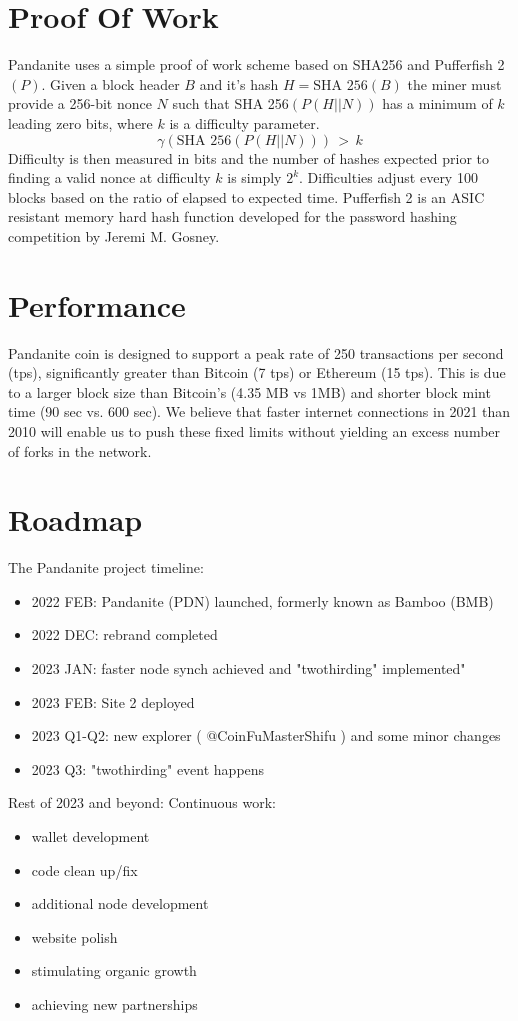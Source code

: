 \documentclass[11pt, a4paper]{elegantpaper}
\begin{document}
\section{ Proof Of Work}
Pandanite uses a simple proof of work scheme based on SHA256 and Pufferfish 2 $(P)$. Given a block
header $B$ and it’s hash $H = \text{SHA 256}(B)$ the miner must provide a 256-bit nonce $N$ such that
SHA 256$(P(H||N))$ has a minimum of $k$ leading zero bits, where $k$ is a difficulty parameter.
\begin{equation}
\gamma(\text{SHA 256}(P(H||N)))\,>\,k
\end{equation}
Difficulty is then measured in bits and the number of hashes expected prior to finding a valid nonce at difficulty $k$ is simply $2^k$. Difficulties adjust every 100 blocks based on the ratio of elapsed to expected time. Pufferfish 2 is an ASIC resistant memory hard hash function developed for the password hashing competition by Jeremi M. Gosney.
\section{Performance}
Pandanite coin is designed to support a peak rate of 250 transactions per second (tps), significantly
greater than Bitcoin (7 tps) or Ethereum (15 tps). This is due to a larger block size than Bitcoin’s
(4.35 MB vs 1MB) and shorter block mint time (90 sec vs. 600 sec). We believe that faster internet
connections in 2021 than 2010 will enable us to push these fixed limits without yielding an excess
number of forks in the network.
\section{ Roadmap}
The Pandanite project timeline:
\begin{itemize}
	 \item 2022 FEB: Pandanite (PDN) launched, formerly known as Bamboo (BMB)
	\item 2022 DEC: rebrand completed 
	\item 2023 JAN: faster node synch achieved and "twothirding" implemented"
	\item 2023 FEB: Site 2 deployed
	\item 2023 Q1-Q2: new explorer ( @CoinFuMasterShifu ) and some minor changes
	\item 2023 Q3: "twothirding" event happens
\end{itemize}
Rest of 2023 and beyond:
Continuous work:
\begin{itemize}
\item wallet development
\item code clean up/fix
\item additional node development
\item website polish
\item stimulating organic growth
\item achieving new partnerships
\end{itemize}
\end{document}
